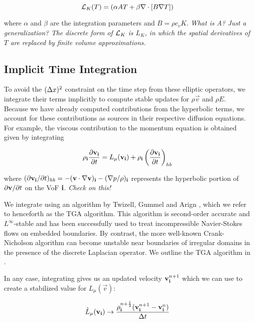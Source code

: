 \begin{equation}
\mathcal{L}_K(T) = \left(\alpha A T + \beta \nabla\cdot{\left[B \nabla{T}\right]}\right)
\end{equation}

\noindent
where $\alpha$ and $\beta$ are the integration parameters and $B = \rho c_v K$.
\em What is A? Just a generalization? \em The discrete form of $\mathcal{L}_K$ is $L_K$, 
in which the spatial derivatives of $T$ are replaced by finite volume 
approximations.

\subsection{Implicit Time Integration}

To avoid the $(\Delta x)^2$ constraint on the time step from these elliptic 
operators, we integrate their terms implicitly to compute stable updates for 
$\rho\vec{v}$ and $\rho E$. Because we have already computed contributions 
from the hyperbolic terms, we account for these contributions as sources in 
their respective diffusion equations. For example, the viscous contribution to 
the momentum equation is obtained given by integrating

\begin{equation}
\rho_{\bf i}\frac{\partial \mathbf{v}_{\bf i}}{\partial t} = L_\mu(\mathbf{v}_{\bf i}) + \rho_{\bf i}\left(\frac{\partial \mathbf{v}_{\bf i}}{\partial t}\right)_{hb} \label{eq:viscContrib}
\end{equation}

\noindent
where $(\partial \mathbf{v}_{\bf i}/\partial t)_{hb} = -(\mathbf{v}\cdot\nabla{\mathbf{v}})_{\bf i} - (\nabla{p}/\rho)_{\bf i}$ 
represents the hyperbolic portion of $\partial \mathbf{v}/\partial t$ on the VoF ${\bf i}$. 
\em Check on this!\em

We integrate  using an algorithm by Twizell, Gummel and Arign 
\cite{TGA}, which we refer to henceforth as the TGA algorithm. This algorithm 
is second-order accurate and $L^\infty$-stable and has been successfully used 
to treat incompressible Navier-Stokes flows on embedded boundaries\cite{???}.
By contrast, the more well-known Crank-Nicholson algorithm can become unstable 
near boundaries of irregular domains in the presence of the discrete Laplacian 
operator\cite{???}. We outline the TGA algorithm in . 

In any case, integrating  gives us an updated velocity 
$\mathbf{v}^{n+1}_{\bf i}$ which we can use to create a stabilized value for 
$L_\mu(\vec{v})$:

\begin{equation}
\hat{L}_\mu(\mathbf{v}_{\bf i}) \rightarrow \frac{\rho^{n+\frac{1}{2}}_{\bf i}(\mathbf{v}^{n+1}_{\bf i} - \mathbf{v}^n_{\bf i})}{\Delta t} \label{eq:stableLmu}
\end{equation}


